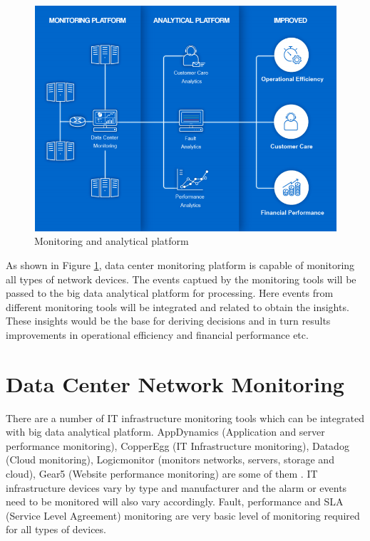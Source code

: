 \documentclass[sigconf]{acmart}
\begin{document}
\begin{figure}[htb]
  \centering
  \includegraphics[width=1.0\textwidth]{images/Figure1.png}
  \caption{Monitoring and analytical platform 
  \cite{datacenter-monitoring-and-analytics-platform}}
  \label{fig:Figure1} 
\end{figure}

As shown in Figure \ref{fig:Figure1}, data center monitoring platform is capable of monitoring all types of network devices. The events captued by the monitoring tools will be passed to the big data analytical platform for processing. Here events from different monitoring tools will be integrated and related to obtain the insights. These insights would be the base for deriving decisions and in turn results improvements in operational efficiency and financial performance etc.

\section{Data Center Network Monitoring}

There are a number of IT infrastructure monitoring tools which can be integrated with big data analytical platform. AppDynamics (Application and server performance monitoring), CopperEgg (IT Infrastructure monitoring), Datadog (Cloud monitoring), Logicmonitor (monitors networks, servers, storage and cloud), Gear5 (Website performance monitoring) are some of them \cite{top-server-monitoring-application-performance-monitoring-apm-solutions}. IT infrastructure devices vary by type and manufacturer and the alarm or events need to be monitored will also vary accordingly. Fault, performance and SLA (Service Level Agreement) monitoring are very basic level of monitoring required for all types of devices.
\end{document}
